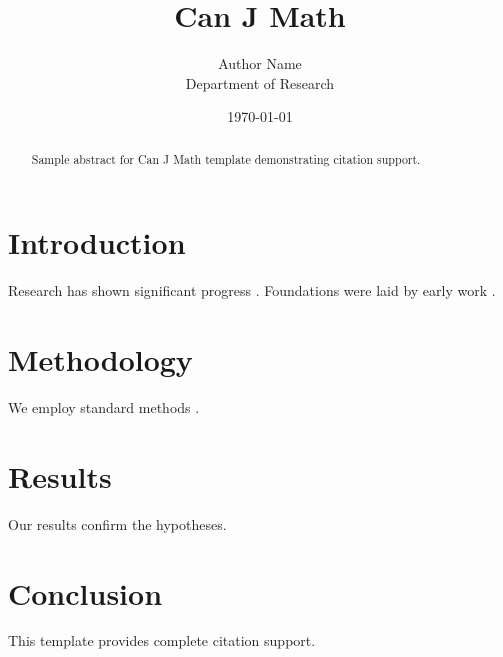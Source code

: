 \documentclass{jfm}
\title{Can J Math}
\author{Author Name \\ \small Department of Research}
\date{\today}
\begin{document}
\maketitle

\begin{abstract}
Sample abstract for Can J Math template demonstrating citation support.
\end{abstract}

\section{Introduction}
Research has shown significant progress \citep{einstein1905}. Foundations were laid by early work \citep{turing1950}.

\section{Methodology}
We employ standard methods \citep{knuth1984}.

\section{Results}
Our results confirm the hypotheses.

\section{Conclusion}
This template provides complete citation support.



\end{document}
